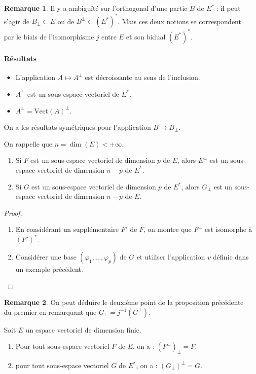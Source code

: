 \documentclass[french]{article}
\newcommand{\st}{^*}
\newcommand{\inv}{^{-1}}
\newcommand{\Vect}{\text{Vect}}
\theoremstyle{plain}
\theoremstyle{definition}
\newtheorem*{rmq}{Remarque}
\theoremstyle{remark}
\begin{document}
\begin{rmq}
	Il y a ambiguïté sur l'orthogonal d'une partie $B$ de $E\st$ : il peut s'agir de $B_\bot\subset E$ ou de $B^\bot\subset (E\st)\st$. Mais ces deux notions se correspondent par le biais de l'isomorphisme $j$ entre $E$ et son bidual $(E\st)\st$.
\end{rmq}

\paragraph{Résultats}
\begin{itemize}
	\item L'application $A\mapsto A^\bot$ est décroissante au sens de l'inclusion.
	\item $A^\bot$ est un sous-espace vectoriel de $E\st$.
	\item $A^\bot=\Vect(A)^\bot$.
\end{itemize}
On a les résultats symétriques pour l'application $B\mapsto B_\bot$.

\begin{prop}%
	On rappelle que $n=\dim(E)<+\infty$.
	\begin{enumerate}
		\item Si $F$ est un sous-espace vectoriel de dimension $p$ de $E$, alors $E^\bot$ est un sous-espace vectoriel de dimension $n-p$ de $E\st$.
		\item Si $G$ est un sous-espace vectoriel de dimension $p$ de $E\st$, alors $G_\bot$ est un sous-espace vectoriel de dimension $n-p$ de $E$.
	\end{enumerate}
\end{prop}
\begin{proof}
	\begin{enumerate}
		\item En considérant un supplémentaire $F'$ de $F$, on montre que $F^\bot$ est isomorphe à $(F')\st$.
		\item Considérer une base $(\varphi_1,\ldots,\varphi_p)$ de $G$ et utiliser l'application $v$ définie dans un exemple précédent.
	\end{enumerate}
\end{proof}

\begin{rmq}
	On peut déduire le deuxième point de la proposition précédente du premier en remarquant que $G_\bot=j\inv(G^\bot)$.
\end{rmq}

\begin{cor}%
	Soit $E$ un espace vectoriel de dimension finie.
	\begin{enumerate}
		\item Pour tout sous-espace vectoriel $F$ de $E$, on a : $(F^\bot)_\bot=F$.
		\item pour tout sous-espace vectoriel $G$ de $E\st$, on a : $(G_\bot)^\bot=G$.
	\end{enumerate}
\end{cor}
\end{document}
